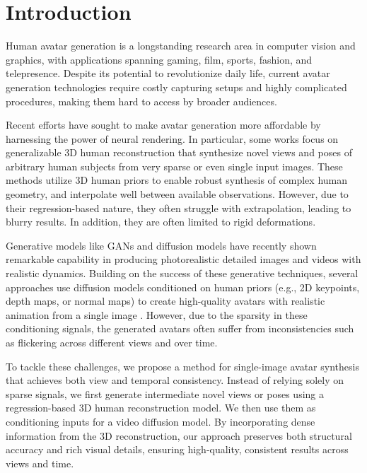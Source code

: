 \section{Introduction}
\label{sec:intro}




Human avatar generation is a longstanding research area in computer vision and graphics, with applications spanning gaming, film, sports, fashion, and telepresence. Despite its potential to revolutionize daily life, current avatar generation technologies require costly capturing setups and highly complicated procedures, making them hard to access by broader audiences.

Recent efforts have sought to make avatar generation more affordable by harnessing the power of neural rendering. In particular, some works \cite{kwon2021neural, kwon2023neural, hu2023sherf, kwon2024generalizable} focus on generalizable 3D human reconstruction that synthesize novel views and poses of arbitrary human subjects from very sparse or even single input images. These methods utilize 3D human priors to enable robust synthesis of complex human geometry, and interpolate well between available observations. However, due to their regression-based nature, they often struggle with extrapolation, leading to blurry results. In addition, they are often limited to rigid deformations. %

Generative models like GANs and diffusion models have recently shown remarkable capability in producing photorealistic detailed images and videos with realistic dynamics.  Building on the success of these generative techniques, several approaches use diffusion models conditioned on human priors (e.g., 2D keypoints, depth maps, or normal maps) to create high-quality avatars with realistic animation from a single image \cite{hu2023animateanyone, zhu2024champ, chang2023magicpose, shao2024human4dit}. However, due to the sparsity in these conditioning signals, the generated avatars often suffer from inconsistencies such as flickering across different views and over time.

To tackle these challenges, we propose a method for single-image avatar synthesis that achieves both view and temporal consistency. 
%
Instead of relying solely on sparse signals, we first generate intermediate novel views or poses using a regression-based 3D human reconstruction model. We then use them as conditioning inputs for a video diffusion model. By incorporating dense information from the 3D reconstruction, our approach preserves both structural accuracy and rich visual details, ensuring high-quality, consistent results across views and time.

